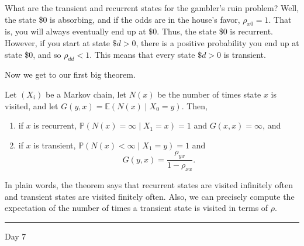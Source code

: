 \documentclass{problemset}
\newcommand{\E}{\mathbb{E}}
\renewcommand{\P}{\mathbb{P}}
\newcommand{\fatrule}[1]{\vspace{.3cm}\hrule {\hfill \sf #1}\par}
\begin{document}
	What are the transient and recurrent states for the gambler's ruin problem?  Well, the
	state \$0 is absorbing, and if the odds are in the house's favor, $\rho_{x0}=1$.  That
	is, you will always eventually end up at $\$0$.  Thus, the state \$0 is recurrent.  However,
	if you start at state $\$d>0$, there is a positive probability you end up at
	state \$0, and so $\rho_{dd}<1$.  This means that every state $\$d>0$ is transient.

	Now we get to our first big theorem.

	\begin{theorem}
		Let $(X_i)$ be a Markov chain, let $N(x)$ be the number of times state
		$x$ is visited, and let $G(y,x)=\E(N(x)\mid X_0=y)$. Then,
		\begin{enumerate}[label=(i)]
			\item if $x$ is recurrent, $\P(N(x) = \infty\mid X_1= x)=1$ and $G(x,x)=\infty$, and
			\item if $x$ is transient, $\P(N(x) < \infty\mid X_1=y)=1$ and
				\[
					G(y,x) = \frac{\rho_{yx}}{1-\rho_{xx}}.
				\]
		\end{enumerate}
	\end{theorem}
	In plain words, the theorem says that recurrent states are visited infinitely
	often and transient states are visited finitely often.  Also, we can precisely
	compute the expectation of the number of times a transient state is visited
	in terms of $\rho$.

	\fatrule{Day 7}
\end{document}
